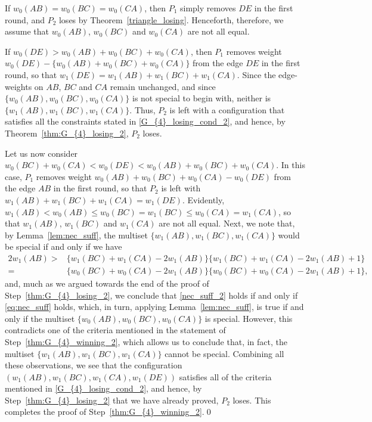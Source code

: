 \documentclass[11pt,reqno]{amsart}
\theoremstyle{definition}
\theoremstyle{definition}
\begin{document}
If $w_{0}(AB)=w_{0}(BC)=w_{0}(CA)$, then $P_{1}$ simply removes $DE$ in the first round, and $P_{2}$ loses by Theorem~\ref{triangle_losing}. Henceforth, therefore, we assume that $w_{0}(AB)$, $w_{0}(BC)$ and $w_{0}(CA)$ are not all equal.

If $w_{0}(DE)>w_{0}(AB)+w_{0}(BC)+w_{0}(CA)$, then $P_{1}$ removes weight $w_{0}(DE)-\{w_{0}(AB)+w_{0}(BC)+w_{0}(CA)\}$ from the edge $DE$ in the first round, so that $w_{1}(DE)=w_{1}(AB)+w_{1}(BC)+w_{1}(CA)$. Since the edge-weights on $AB$, $BC$ and $CA$ remain unchanged, and since $\{w_{0}(AB),w_{0}(BC),w_{0}(CA)\}$ is not special to begin with, neither is $\{w_{1}(AB),w_{1}(BC),w_{1}(CA)\}$. Thus, $P_{2}$ is left with a configuration that satisfies all the constraints stated in \eqref{G_{4}_losing_cond_2}, and hence, by Theorem~\ref{thm:G_{4}_losing_2}, $P_{2}$ loses.

Let us now consider $w_{0}(BC)+w_{0}(CA)<w_{0}(DE)<w_{0}(AB)+w_{0}(BC)+w_{0}(CA)$. In this case, $P_{1}$ removes weight $w_{0}(AB)+w_{0}(BC)+w_{0}(CA)-w_{0}(DE)$ from the edge $AB$ in the first round, so that $P_{2}$ is left with $w_{1}(AB)+w_{1}(BC)+w_{1}(CA)=w_{1}(DE)$. Evidently, $w_{1}(AB)<w_{0}(AB)\leqslant w_{0}(BC)=w_{1}(BC)\leqslant w_{0}(CA)=w_{1}(CA)$, so that $w_{1}(AB)$, $w_{1}(BC)$ and $w_{1}(CA)$ are not all equal. Next, we note that, by Lemma~\ref{lem:nec_suff}, the multiset $\{w_{1}(AB),w_{1}(BC),w_{1}(CA)\}$ would be special if and only if we have
\begin{align}
2w_{1}(AB)>{}&\{w_{1}(BC)+w_{1}(CA)-2w_{1}(AB)\}\{w_{1}(BC)+w_{1}(CA)-2w_{1}(AB)+1\}\nonumber\\
={}&\{w_{0}(BC)+w_{0}(CA)-2w_{1}(AB)\}\{w_{0}(BC)+w_{0}(CA)-2w_{1}(AB)+1\},\label{nec_suff_2}
\end{align}
and, much as we argued towards the end of the proof of Step~\eqref{thm:G_{4}_losing_2}, we conclude that \eqref{nec_suff_2} holds if and only if \eqref{eq:nec_suff} holds, which, in turn, applying Lemma~\ref{lem:nec_suff}, is true if and only if the multiset $\{w_{0}(AB),w_{0}(BC),w_{0}(CA)\}$ is special. However, this contradicts one of the criteria mentioned in the statement of Step~\eqref{thm:G_{4}_winning_2}, which allows us to conclude that, in fact, the multiset $\{w_{1}(AB),w_{1}(BC),w_{1}(CA)\}$ cannot be special. Combining all these observations, we see that the configuration $(w_{1}(AB),w_{1}(BC),w_{1}(CA),w_{1}(DE))$ satisfies all of the criteria mentioned in \eqref{G_{4}_losing_cond_2}, and hence, by Step~\eqref{thm:G_{4}_losing_2} that we have already proved, $P_{2}$ loses. This completes the proof of Step~\eqref{thm:G_{4}_winning_2}.\qed
\end{document}
